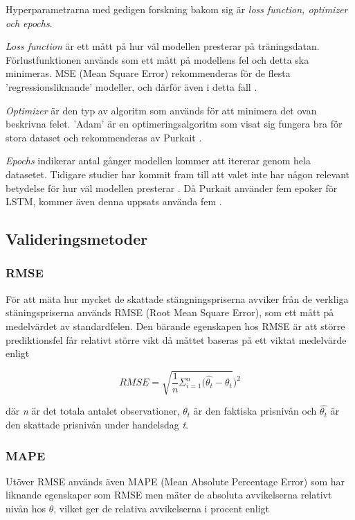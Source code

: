 \documentclass[12pt]{article}
\begin{document}
Hyperparametrarna med gedigen forskning bakom sig är \emph{loss function, optimizer och epochs}. \par
\emph{Loss function} är ett mått på hur väl modellen presterar på träningsdatan. Förlustfunktionen används som ett mått på modellens fel och detta ska minimeras. MSE (Mean Square Error) rekommenderas för de flesta 'regressionsliknande' modeller, och därför även i detta fall \parencite{purkait2019hands}. \par
\emph{Optimizer} är den typ av algoritm som används för att minimera det ovan beskrivna felet. 'Adam' är en optimeringsalgoritm som visat sig fungera bra för stora dataset och rekommenderas av Purkait \parencite{purkait2019hands}. \par
\emph{Epochs} indikerar antal gånger modellen kommer att itererar genom hela datasetet. Tidigare studier har kommit fram till att valet inte har någon relevant betydelse för hur väl modellen presterar \parencite{siami2018forecasting}. Då Purkait använder fem epoker för LSTM, kommer även denna uppsats använda fem \parencite{purkait2019hands}. \par


\subsection{Valideringsmetoder}
\subsubsection{RMSE}
För att mäta hur mycket de skattade stängningspriserna avviker från de verkliga stäningspriserna används RMSE (Root Mean Square Error), som ett mått på medelvärdet av standardfelen. Den bärande egenskapen hos RMSE är att större prediktionsfel får relativt större vikt då måttet baseras på ett viktat medelvärde enligt

\begin{equation*}
RMSE = \sqrt{\frac{1}{n}\Sigma_{i=1}^{n}   (\hat{\theta_{t}} - \theta_{t}})^2
\end{equation*}

där \emph{n} är det totala antalet observationer, $\theta_{t}$ är den faktiska prisnivån och $\hat{\theta_{t}}$ är den skattade prisnivån under handelsdag \emph{t}. 

\subsubsection{MAPE}
Utöver RMSE används även MAPE (Mean Absolute Percentage Error) som har liknande egenskaper som RMSE men mäter de absoluta avvikelserna relativt nivån hos $\theta$, vilket ger de relativa avvikelserna i procent enligt
\end{document}
